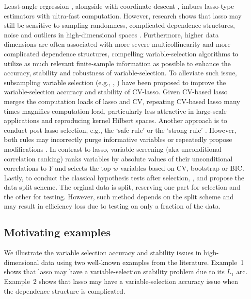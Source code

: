 \documentclass[12pt]{article}
\begin{document}
Least-angle regression \citep{efronall04, friedman2010regularization}, alongside with coordinate descent \citep{friedman2007pathwise}, imbues lasso-type estimators with ultra-fast computation. However, research shows that lasso may still be sensitive to sampling randomness, complicated dependence structures, noise and outliers in high-dimensional spaces \citep{weisberg04,lim2016estimation}. Furthermore, higher data dimensions are often associated with more severe multicollinearity and more complicated dependence structures, compelling variable-selection algorithms to utilize as much relevant finite-sample information as possible to enhance the accuracy, stability and robustness of variable-selection. To alleviate such issue, subsampling variable selection (e.g., \citet{bach2008bolasso}, \citet{meinshausen2010stability}) have been proposed to improve the variable-selection accuracy and stability of CV-lasso. Given CV-based lasso merges the computation loads of lasso and CV, repeating CV-based lasso many times magnifies computation load, particularly less attractive in large-scale applications and reproducing kernel Hilbert spaces. Another approach is to conduct post-lasso selection, e.g., the `safe rule' \citep{ghaoui2010safe} or the `strong rule' \citep{tibshirani2012strong}. However, both rules may incorrectly purge informative variables or repeatedly propose modifications \citep{wang2014safe, zeng2017efficient}. In contrast to lasso, variable screening (aka unconditional correlation ranking) \citep{fan2008sure, li2012feature, li2012robust} ranks variables by absolute values of their unconditional correlations to $Y$ and selects the top $w$ variables based on CV, bootstrap or BIC. Lastly, to conduct the classical hypothesis tests after selection, \citet{wasserman2009high}, \citet{meinshausen2009p} and \citet{barber2019knockoff} propose the data split scheme. The orginal data is split, reserving one part for selection and the other for testing. However, such method depends on the split scheme and may result in efficiency loss due to testing on only a fraction of the data.

\subsection{Motivating examples}
%
We illustrate the variable selection accuracy and stability issues in high-dimensional data using two well-known examples from the literature. Example~1 shows that lasso may have a variable-selection stability problem due to its $L_1$ arc. Example~2 shows that lasso may have a variable-selection accuracy issue when the dependence structure is complicated.
\end{document}
